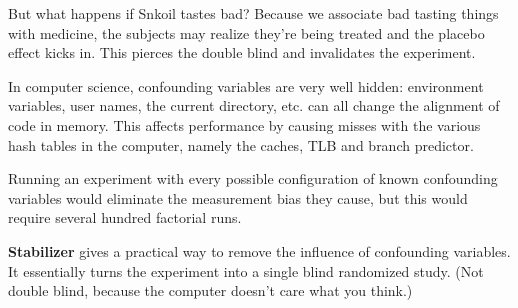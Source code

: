 \documentclass[twoside]{article}
\begin{document}
But what happens if Snkoil tastes bad? Because we associate bad tasting things
with medicine, the subjects may realize they're being treated and the placebo
effect kicks in. This pierces the double blind and invalidates the experiment.

In computer science, confounding variables are very well hidden: environment
variables, user names, the current directory, etc. can all change the alignment
of code in memory. This affects performance by causing misses with the various
hash tables in the computer, namely the caches, TLB and branch predictor.

Running an experiment with every possible configuration of known confounding
variables would eliminate the measurement bias they cause, but this would
require several hundred factorial runs.

\textbf{Stabilizer} gives a practical way to remove the influence of confounding
variables. It essentially turns the experiment into a single blind randomized
study. (Not double blind, because the computer doesn't care what you think.)
\end{document}
